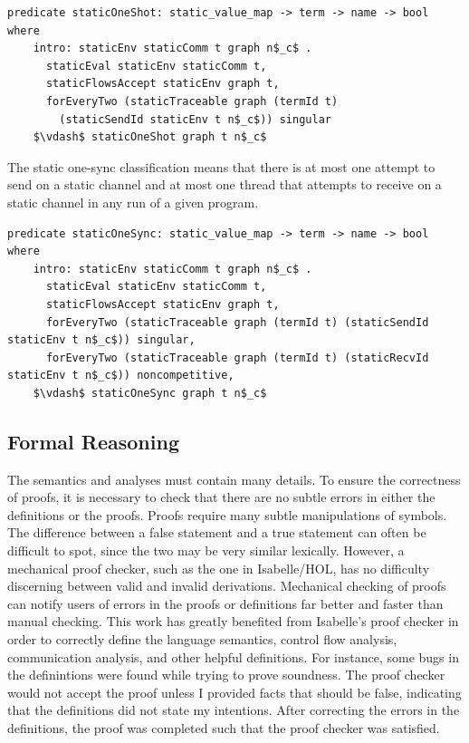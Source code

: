 \documentclass[letterpaper, 11pt]{extarticle}
\begin{document}
\begin{lstlisting}[language=logic, mathescape]
  predicate staticOneShot: static_value_map -> term -> name -> bool where
    intro: staticEnv staticComm t graph n$_c$ .
      staticEval staticEnv staticComm t,
      staticFlowsAccept staticEnv graph t,
      forEveryTwo (staticTraceable graph (termId t)
        (staticSendId staticEnv t n$_c$)) singular
    $\vdash$ staticOneShot graph t n$_c$
\end{lstlisting}

The static one-sync classification means that there is at most one attempt to send on a
static channel and at most one
thread that attempts to receive on a static channel in any run of a given program.

\begin{lstlisting}[language=logic, mathescape]
  predicate staticOneSync: static_value_map -> term -> name -> bool where
    intro: staticEnv staticComm t graph n$_c$ .
      staticEval staticEnv staticComm t,
      staticFlowsAccept staticEnv graph t,
      forEveryTwo (staticTraceable graph (termId t) (staticSendId staticEnv t n$_c$)) singular,
      forEveryTwo (staticTraceable graph (termId t) (staticRecvId staticEnv t n$_c$)) noncompetitive,
    $\vdash$ staticOneSync graph t n$_c$
\end{lstlisting}



\subsection{Formal Reasoning}
The semantics and analyses must contain many details. To ensure the
correctness of proofs, it is necessary to check that there are no subtle errors in either the 
definitions or the proofs. Proofs require many subtle manipulations of symbols. The
difference between a false statement and a true statement can often be difficult to spot, since
the two may be very similar lexically. However, a mechanical proof checker, such as the one in
Isabelle/HOL, has no difficulty discerning between valid and invalid derivations.
Mechanical checking of proofs can notify users of errors in the proofs or definitions far better
and faster than manual checking. This work has greatly benefited from Isabelle's proof checker in
order to correctly define the language semantics, control flow analysis, communication analysis,
and other helpful definitions. For instance, some bugs in the
definintions were found while trying to prove soundness.
The proof checker would not accept the proof unless I provided facts that
should be false, indicating that the definitions did not state my intentions.
After correcting the errors in the definitions, the proof was completed such that the proof
checker was satisfied.
\end{document}
